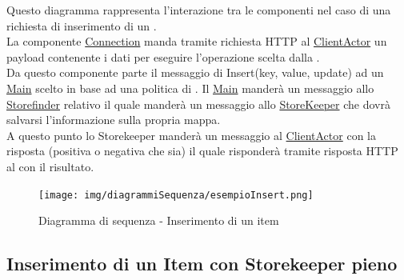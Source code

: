 \documentclass{scalatekids-article}
\begin{document}
Questo diagramma rappresenta l'interazione tra le componenti nel caso di una richiesta di inserimento di un .\\
La componente \hyperref[sec:actorbase::driver::client::Connection]{Connection}
manda tramite richiesta HTTP al \hyperref[sec:actorbase::actorsystem::actors::clientactor::ClientActor]{ClientActor}
un payload contenente i dati per eseguire l'operazione scelta dalla .\\
Da questo componente parte il messaggio di Insert(key, value, update) ad un \hyperref[sec:actorbase::actorsystem::actors::main::Main]{Main} scelto in base ad una
politica di . Il \hyperref[sec:actorbase::actorsystem::actors::main::Main]{Main} manderà un messaggio allo \hyperref[sec:actorbase::actorsystem::actors::storefinder::Storefinder]{Storefinder} relativo il quale manderà un messaggio allo \hyperref[sec:actorbase::actorsystem::actors::storekeeper::StoreKeeper]{StoreKeeper} che dovrà salvarsi l'informazione
sulla propria mappa.\\
A questo punto lo Storekeeper manderà un messaggio al \hyperref[sec:actorbase::actorsystem::actors::clientactor::ClientActor]{ClientActor} con la risposta
(positiva o negativa che sia) il quale risponderà tramite risposta HTTP al  con il risultato.
\begin{figure}[H]
  \begin{center}
    \texttt{[image: img/diagrammiSequenza/esempioInsert.png]}
    \caption{Diagramma di sequenza - Inserimento di un item}
  \end{center}
\end{figure}

\subsection{Inserimento di un Item con Storekeeper pieno}
\end{document}
